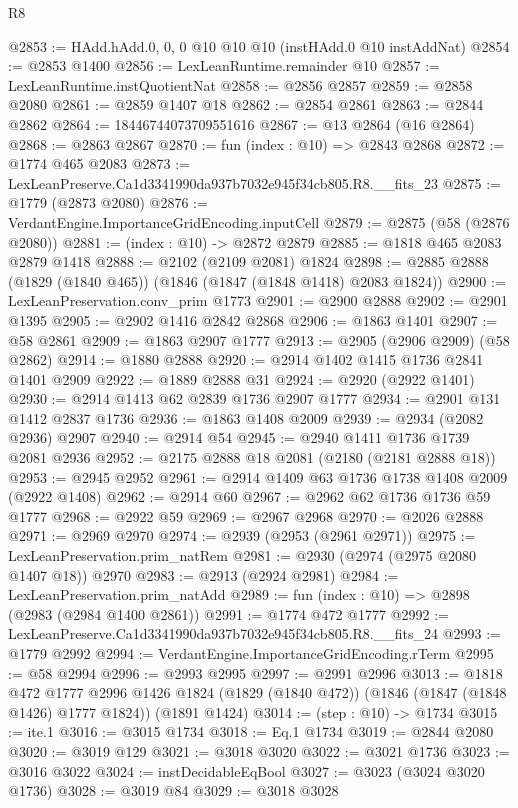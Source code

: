 \begin{lexlean}{R8}
\begin{coremodule}
@2853 := HAdd.hAdd.{0, 0, 0} @10 @10 @10 (instHAdd.{0} @10 instAddNat)
@2854 := @2853 @1400
@2856 := LexLeanRuntime.remainder @10
@2857 := LexLeanRuntime.instQuotientNat
@2858 := @2856 @2857
@2859 := @2858 @2080
@2861 := @2859 @1407 @18
@2862 := @2854 @2861
@2863 := @2844 @2862
@2864 := 18446744073709551616
@2867 := @13 @2864 (@16 @2864)
@2868 := @2863 @2867
@2870 := fun (index : @10) => @2843 @2868
@2872 := @1774 @465 @2083
@2873 := LexLeanPreserve.Ca1d3341990da937b7032e945f34cb805.R8.__fits_23
@2875 := @1779 (@2873 @2080)
@2876 := VerdantEngine.ImportanceGridEncoding.inputCell
@2879 := @2875 (@58 (@2876 @2080))
@2881 := (index : @10) -> @2872 @2879
@2885 := @1818 @465 @2083 @2879 @1418
@2888 := @2102 (@2109 @2081) @1824
@2898 := @2885 @2888 (@1829 (@1840 @465)) (@1846 (@1847 (@1848 @1418) @2083 @1824))
@2900 := LexLeanPreservation.conv_prim @1773
@2901 := @2900 @2888
@2902 := @2901 @1395
@2905 := @2902 @1416 @2842 @2868
@2906 := @1863 @1401
@2907 := @58 @2861
@2909 := @1863 @2907 @1777
@2913 := @2905 (@2906 @2909) (@58 @2862)
@2914 := @1880 @2888
@2920 := @2914 @1402 @1415 @1736 @2841 @1401 @2909
@2922 := @1889 @2888 @31
@2924 := @2920 (@2922 @1401)
@2930 := @2914 @1413 @62 @2839 @1736 @2907 @1777
@2934 := @2901 @131 @1412 @2837 @1736
@2936 := @1863 @1408 @2009
@2939 := @2934 (@2082 @2936) @2907
@2940 := @2914 @54
@2945 := @2940 @1411 @1736 @1739 @2081 @2936
@2952 := @2175 @2888 @18 @2081 (@2180 (@2181 @2888 @18))
@2953 := @2945 @2952
@2961 := @2914 @1409 @63 @1736 @1738 @1408 @2009 (@2922 @1408)
@2962 := @2914 @60
@2967 := @2962 @62 @1736 @1736 @59 @1777
@2968 := @2922 @59
@2969 := @2967 @2968
@2970 := @2026 @2888
@2971 := @2969 @2970
@2974 := @2939 (@2953 (@2961 @2971))
@2975 := LexLeanPreservation.prim_natRem
@2981 := @2930 (@2974 (@2975 @2080 @1407 @18)) @2970
@2983 := @2913 (@2924 @2981)
@2984 := LexLeanPreservation.prim_natAdd
@2989 := fun (index : @10) => @2898 (@2983 (@2984 @1400 @2861))
@2991 := @1774 @472 @1777
@2992 := LexLeanPreserve.Ca1d3341990da937b7032e945f34cb805.R8.__fits_24
@2993 := @1779 @2992
@2994 := VerdantEngine.ImportanceGridEncoding.rTerm
@2995 := @58 @2994
@2996 := @2993 @2995
@2997 := @2991 @2996
@3013 := @1818
    @472
    @1777
    @2996
    @1426
    @1824
    (@1829 (@1840 @472))
    (@1846 (@1847 (@1848 @1426) @1777 @1824))
    (@1891 @1424)
@3014 := (step : @10) -> @1734
@3015 := ite.{1}
@3016 := @3015 @1734
@3018 := Eq.{1} @1734
@3019 := @2844 @2080
@3020 := @3019 @129
@3021 := @3018 @3020
@3022 := @3021 @1736
@3023 := @3016 @3022
@3024 := instDecidableEqBool
@3027 := @3023 (@3024 @3020 @1736)
@3028 := @3019 @84
@3029 := @3018 @3028

\end{coremodule}
\end{lexlean}

